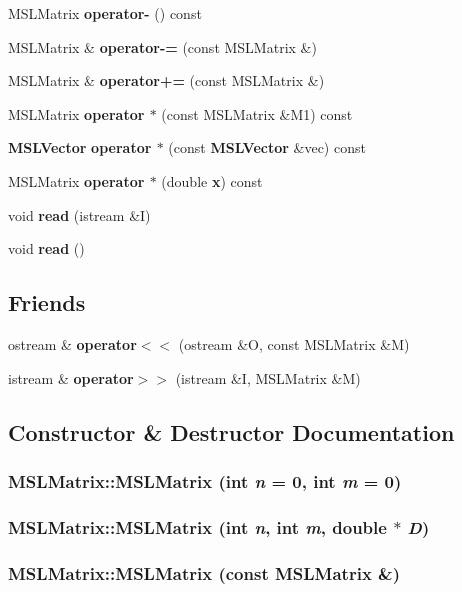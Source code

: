\begin{CompactItemize}
\item 
MSLMatrix {\bf operator-} () const
\item 
MSLMatrix \& {\bf operator-=} (const MSLMatrix \&)
\item 
MSLMatrix \& {\bf operator+=} (const MSLMatrix \&)
\item 
MSLMatrix {\bf operator $\ast$} (const MSLMatrix \&M1) const
\item 
{\bf MSLVector} {\bf operator $\ast$} (const {\bf MSLVector} \&vec) const
\item 
MSLMatrix {\bf operator $\ast$} (double {\bf x}) const
\item 
void {\bf read} (istream \&I)
\item 
void {\bf read} ()
\end{CompactItemize}
\subsection*{Friends}
\begin{CompactItemize}
\item 
ostream \& {\bf operator$<$$<$} (ostream \&O, const MSLMatrix \&M)
\item 
istream \& {\bf operator$>$$>$} (istream \&I, MSLMatrix \&M)
\end{CompactItemize}


\subsection{Constructor \& Destructor Documentation}
\subsubsection{\setlength{\rightskip}{0pt plus 5cm}MSLMatrix::MSLMatrix (int {\em n} = 0, int {\em m} = 0)}\label{classMSLMatrix_a0}


\subsubsection{\setlength{\rightskip}{0pt plus 5cm}MSLMatrix::MSLMatrix (int {\em n}, int {\em m}, double $\ast$ {\em D})}\label{classMSLMatrix_a1}


\subsubsection{\setlength{\rightskip}{0pt plus 5cm}MSLMatrix::MSLMatrix (const MSLMatrix \&)}\label{classMSLMatrix_a2}


